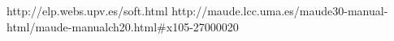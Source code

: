http://elp.webs.upv.es/soft.html
http://maude.lcc.uma.es/maude30-manual-html/maude-manualch20.html#x105-27000020

